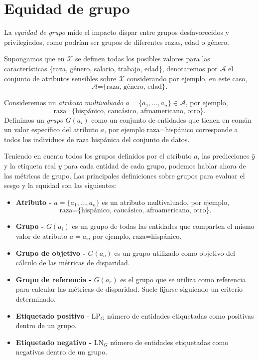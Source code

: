 \documentclass[oneside,openright,titlepage,numbers=noenddot,openany,headinclude,footinclude=true,
cleardoublepage=empty,abstractoff,BCOR=5mm,paper=a4,fontsize=12pt,main=spanish]{scrreprt}
\begin{document}
\section{Equidad de grupo} 
\label{sec:groupmetrics}

La \textit{equidad de grupo} mide el impacto dispar entre grupos desfavorecidos y privilegiados, como podrían ser grupos de diferentes razas, edad o género.

Supongamos que en $\mathcal{X}$ se definen todas los posibles valores para las características \{raza, género, salario, trabajo, edad\}, denotaremos por $\mathcal{A}$ el conjunto de atributos sensibles sobre $\mathcal{X}$ considerando por ejemplo, en este caso, $$\mathcal{A}\text{=\{raza, género, edad\}}.$$

Consideremos un \textit{atributo multivaluado} $a = \{a_1,\dots,a_n\} \in \mathcal{A}$, por ejemplo, $$\text{raza=\{hispánico, caucásico, afroamericano, otro\}}.$$ Definimos un \textit{grupo} $G(a_i)$
como un conjunto de entidades que tienen en común un valor específico
del atributo $a$, por ejemplo raza=hispánico corresponde a todos los individuos de raza hispánica del
conjunto de datos.

Teniendo en cuenta todos los grupos definidos por el atributo $a$, las predicciones $\hat{y}$ y la etiqueta real $y$ para cada entidad de cada grupo, podemos hablar ahora de las métricas de grupo. Las principales definiciones sobre grupos para evaluar el sesgo y la equidad son las siguientes:

\begin{itemize}
    \item \textbf{Atributo -} $a = \{a_1,\dots,a_n\}$ es un atributo multivaluado, por ejemplo, $$\text{raza=\{hispánico, caucásico, afroamericano, otro\}}.$$
    \item \textbf{Grupo -} $G(a_i)$ es un grupo de todas las entidades que comparten el mismo valor de atributo $a=a_i$, por ejemplo, raza=hispánico.
    \item \textbf{Grupo de objetivo -} $G(a_o)$ es un grupo utilizado como objetivo del cálculo de las métricas de disparidad.
    \item \textbf{Grupo de referencia -} $G(a_r)$ es el grupo que se utiliza como referencia para calcular las métricas de disparidad. Suele fijarse siguiendo un criterio determinado.
    \item \textbf{Etiquetado positivo} - LP$_G$ número de entidades etiquetadas como positivas dentro de un grupo.
    \item \textbf{Etiquetado negativo -} LN$_G$ número de entidades etiquetadas como negativas dentro de un grupo.
\end{itemize}
\end{document}
